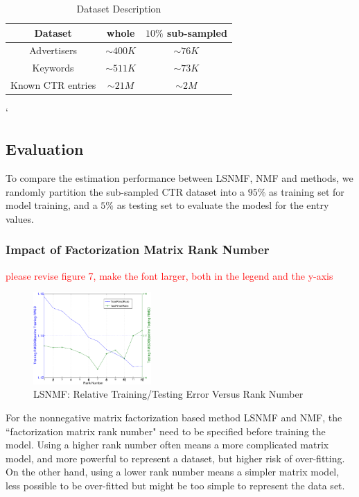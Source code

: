 \begin{table}[!ht]
  \centering
  \begin{tabular}{|c|c|c|}
    \hline	\hline
    Dataset & whole & $10\%$ sub-sampled\\ \hline
    Advertisers & $\sim 400K$ & $\sim 76K$  \\ 
    Keywords & $\sim 511K$ & $\sim 73K$  \\ 
    Known CTR entries &  $\sim 21M$ & $\sim 2M$ \\ \hline
  \end{tabular}`
  \caption{Dataset Description}
  \label{tab:data}
\end{table}

\subsection{Evaluation}
To compare the estimation performance between LSNMF, NMF and {\sppan}
methods, we randomly partition the sub-sampled CTR dataset into a
$95\%$ as training set for model training, and a $5\%$ as testing set
to evaluate the modesl for the entry values.

\subsubsection{Impact of Factorization Matrix Rank Number}
\textcolor{red}{please revise figure 7, make the font larger, both in
  the legend and the y-axis}

\begin{figure}[!ht]
  \centering
  \includegraphics[width=0.4\textwidth]{figures/learning_curve_lsnmf_subsample_relative.eps}
  \caption{LSNMF: Relative Training/Testing Error Versus Rank Number}
  \label{fig:lsnmf_learning}
\end{figure}

For the nonnegative matrix factorization based method LSNMF and NMF,
the ``factorization matrix rank number"\cite{??} need to be specified
before training the model. Using a higher rank number often means a
more complicated matrix model, and more powerful to represent a
dataset, but higher risk of over-fitting. On the other hand, using a
lower rank number means a simpler matrix model, less possible to be
over-fitted but might be too simple to represent the data set.

